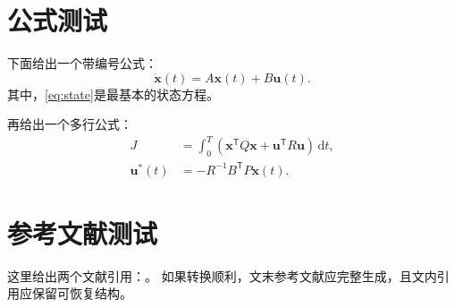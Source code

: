 \documentclass[12pt,a4paper]{article}
\begin{document}
\section{公式测试}
下面给出一个带编号公式：
\begin{equation}
\label{eq:state}
\dot{\bm{x}}(t)=A\bm{x}(t)+B\bm{u}(t).
\end{equation}
其中，\eqref{eq:state}是最基本的状态方程。

再给出一个多行公式：
\begin{align}
J &= \int_{0}^{T}\left(\bm{x}^\mathsf{T}Q\bm{x}+\bm{u}^\mathsf{T}R\bm{u}\right)\,\mathrm{d}t, \\
\bm{u}^{\ast}(t) &= -R^{-1}B^\mathsf{T}P\bm{x}(t).
\end{align}

\section{参考文献测试}
这里给出两个文献引用：\cite{kalman1960new,bertsekas1995dynamic}。
如果转换顺利，文末参考文献应完整生成，且文内引用应保留可恢复结构。

\printbibliography
\end{document}
